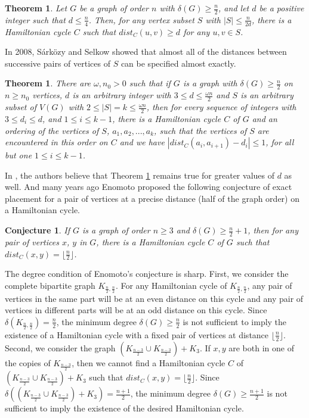 \documentclass[11pt]{article}
\newtheorem{theorem}[lemma]{Theorem}
\newtheorem{conjecture}[lemma]{Conjecture}
\begin{document}
\begin{theorem}\cite{kaneko}
Let $G$ be a graph of order $n$ with $\delta(G)\geq \frac{n}{2}$, and let $d$ be a positive integer such that $d\leq \frac{n}{4}$. Then, for any vertex subset $S$ with $|S|\leq \frac{n}{2d}$, there is a Hamiltonian cycle $C$ such that $dist_C(u,v)\geq d$ for any $u,v\in S$.
\end{theorem}

In 2008, S\'{a}rk\"{o}zy and Selkow \cite{sarkozy} showed that almost all of the distances between successive pairs of vertices of $S$ can be specified almost exactly.

\begin{theorem}\cite{sarkozy}\label{sarkozy}
There are $\omega , n_0>0$ such that if $G$ is a graph with $\delta(G)\geq \frac{n}{2}$ on $n\geq n_0$ vertices, $d$ is an arbitrary integer with $3\leq d\leq \frac{\omega n}{2}$ and $S$ is an arbitrary subset of $V(G)$ with $2\leq |S|=k\leq \frac{\omega n}{2}$, then for every sequence of integers with $3\leq d_i\leq d$, and $1\leq i\leq k-1$, there is a Hamiltonian cycle $C$ of $G$ and an ordering of the vertices of $S$, $a_1,a_2,...,a_k$, such that the vertices of $S$ are encountered in this order on $C$ and we have $|dist_C(a_i,a_{i+1})-d_i|\leq 1$, for all but one $1\leq i\leq k-1$.
\end{theorem}

In \cite{sarkozy}, the authors believe that Theorem \ref{sarkozy} remains true for greater values of $d$ as well. And many years ago Enomoto proposed the following conjecture of exact placement for a pair of vertices at a precise distance (half of the graph order) on a Hamiltonian cycle.

\begin{conjecture}\cite{gouldsurvey}\label{enomoto}
If $G$ is a graph of order $n\geq 3$ and $\delta(G)\geq \frac{n}{2}+1$, then for any pair of vertices $x$, $y$ in $G$, there is a Hamiltonian cycle $C$ of $G$ such that $dist_C(x,y)=\lfloor \frac{n}{2}\rfloor$.
\end{conjecture}

The degree condition of Enomoto's conjecture is sharp. First, we consider the complete bipartite graph $K_{\frac{n}{2},\frac{n}{2}}$. For any Hamiltonian cycle of $K_{\frac{n}{2},\frac{n}{2}}$, any pair of vertices in the same part will be at an even distance on this cycle and any pair of vertices in different parts will be at an odd distance on this cycle. Since $\delta(K_{\frac{n}{2},\frac{n}{2}})=\frac{n}{2}$, the minimum degree $\delta(G)\geq \frac{n}{2}$ is not sufficient to imply the existence of a Hamiltonian cycle with a fixed pair of vertices at distance $\lfloor \frac{n}{2}\rfloor$. Second, we consider the graph $(K_{\frac{n-3}{2}}\cup K_{\frac{n-3}{2}})+K_3$. If $x,y$ are both in one of the copies of $K_{\frac{n-3}{2}}$, then we cannot find a Hamiltonian cycle $C$ of $(K_{\frac{n-3}{2}}\cup K_{\frac{n-3}{2}})+K_3$ such that $dist_C(x,y)=\lfloor \frac{n}{2}\rfloor$. Since $\delta((K_{\frac{n-3}{2}}\cup K_{\frac{n-3}{2}})+K_3)=\frac{n+1}{2}$, the minimum degree $\delta(G)\geq \frac{n+1}{2}$ is not sufficient to imply the existence of the desired Hamiltonian cycle.
\end{document}
